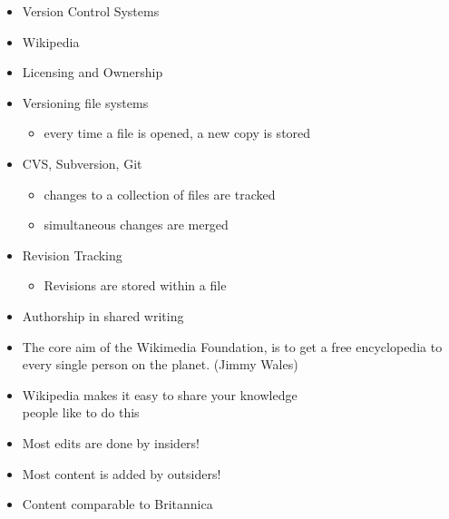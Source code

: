 \documentclass[a4paper,landscape,headrule,footrule,xetex]{foils}
\begin{document}



\maketitle

%



\MyLogo{}
\begin{itemize}
\item Version Control Systems
\item Wikipedia
\item Licensing and Ownership 
\end{itemize}


\begin{itemize}
\item Versioning file systems
  \begin{itemize}
  \item  every time a file is opened, a new copy is stored
  \end{itemize}
\item CVS, Subversion, Git
  \begin{itemize}
  \item changes to a collection of files are tracked
  \item simultaneous changes are merged
  \end{itemize}
\item Revision Tracking
  \begin{itemize}
  \item Revisions are stored within a file
  \end{itemize}
\item Authorship in shared writing
\end{itemize}

\begin{itemize}
\item  The core aim of the Wikimedia Foundation, is to get a free
  encyclopedia to every single person on the planet. (Jimmy Wales)
\item Wikipedia makes it easy to share your knowledge
 \\ people like to do this
\item Most edits are done by insiders!
\item Most content is added by outsiders!
\item Content comparable to Britannica
\end{itemize}
\end{document}

